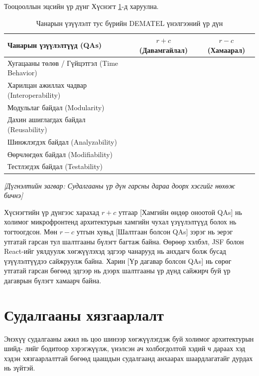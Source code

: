Тооцооллын эцсийн үр дүнг Хүснэгт \ref{tab:dematel_results}-д харуулна.

\begin{table}[H]
\centering
\renewcommand{\arraystretch}{0.7}
\begin{tabular}{lcc}
\toprule
\textbf{Чанарын үзүүлэлтүүд (QAs)} & \textbf{$r+c$ (Давамгайлал)} & \textbf{$r-c$ (Хамаарал)} \\ 
\midrule
Хугацааны төлөв / Гүйцэтгэл (Time Behavior) &  &  \\ 
Харилцан ажиллах чадвар (Interoperability) &  &  \\ 
Модульлаг байдал (Modularity) &  &  \\ 
Дахин ашиглагдах байдал (Reusability) &  &  \\ 
Шинжлэгдэх байдал (Analyzability) &  &  \\ 
Өөрчлөгдөх байдал (Modifiability) &  &  \\ 
Тестлэгдэх байдал (Testability) &  &  \\ 
\bottomrule
\end{tabular}
\caption{Чанарын үзүүлэлт тус бүрийн DEMATEL үнэлгээний үр дүн}
\label{tab:dematel_results}
\end{table}

\textit{[Дүгнэлтийн загвар: Судалгааны үр дүн гарсны дараа доорх хэсгийг нөхөж бичнэ]}

Хүснэгтийн үр дүнгээс харахад $r+c$ утгаар [Хамгийн өндөр оноотой QAs] нь холимог микрофронтенд архитектурын хамгийн чухал үзүүлэлтүүд болох нь тогтоогдсон. Мөн $r-c$ утгын хувьд [Шалтгаан болсон QAs] зэрэг нь эерэг утгатай гарсан тул шалтгааны бүлэгт багтаж байна. Өөрөөр хэлбэл, JSF болон React-ийг уялдуулж хөгжүүлэхэд эдгээр чанарууд нь анхдагч болж бусад үзүүлэлтүүдээ сайжруулж байна. Харин [Үр дагавар болсон QAs] нь сөрөг утгатай гарсан бөгөөд эдгээр нь дээрх шалтгааны үр дүнд сайжирч буй үр дагаврын бүлэгт хамаарч байна.

\section{Судалгааны хязгаарлалт}

Энэхүү судалгааны ажил нь цоо шинээр хөгжүүлэгдэж буй холимог архитектурын шийд- лийг бодитоор хэрэгжүүлж, үнэлсэн ач холбогдолтой хэдий ч дараах хэд хэдэн хязгаарлалттай бөгөөд цаашдын судалгаанд анхаарах шаардлагатайг дурдах нь зүйтэй.

